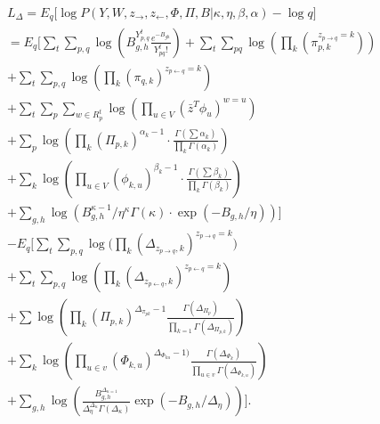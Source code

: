 \begin{align}
&L_{\Delta} = E_{q}\bigg[ \log \! P(Y, W, z_{\rightarrow}, z_{\leftarrow}, \Phi,
\Pi, B | \kappa, \eta, \beta, \alpha) - \log \! q \bigg]\nonumber\\
&= E_{q} \Bigg[ \sum_{t} \! \sum_{p,q} \! \log \left(
B_{g,h}^{Y_{p,q}^t} \frac{e^{-B_{gh}}}{Y_{pq}^{t}!} \right) +
\sum_{t} \! \sum_{pq} \! \log\left( \prod_{k} (\pi_{p,k}^{z_{p \rightarrow q} =
k}) \right) \nonumber\\
&+ \sum_{t} \! \sum_{p,q} \log \! \left(
\prod_{k}(\pi_{q,k})^{z_{p \leftarrow q} = k} \right)\nonumber\\ 
&+\sum_{t} \! \sum_{p} \! \sum_{w\in R_p^t}  \log \! \left(
\prod_{u\in V}(\bar{z}^T\phi_u)^{w = u} \right)
\nonumber\\ &+ 
\sum_{p} \! \log \left( \prod_{k}
(\Pi_{p,k})^{\alpha_{k} - 1} \cdot \frac{\Gamma(\sum \alpha_{k})}{\prod_{k}
\Gamma(\alpha_{k})} \right) \nonumber\\ & + 
\sum_{k} \! \log\left( \prod_{u\in V}
(\phi_{k,u})^{\beta_{k} - 1} \cdot \frac{\Gamma(\sum \beta_{k})}{\prod_{k}
\Gamma(\beta_{k})} \right) \nonumber\\ &+
 \sum_{g,h} \! \log \! \left( B_{g,h}^{\kappa - 1} /
\eta^{\kappa} \Gamma(\kappa) \cdot \exp(-B_{g,h}/\eta) \right) \Bigg]
\nonumber\\ 
& -E_{q} \Bigg[ \sum_{t} \! \sum_{p,q} \log \big( \prod_{k} (\Delta_{z_{p
\rightarrow q}, k})^{z_{p \rightarrow q}=k} \big) \nonumber \\&+ \sum_{t} \!
\sum_{p,q} \! \log \! \left(
\prod_{k} \! (\Delta_{z_{p \leftarrow q}, k})^{z_{p \leftarrow q} = k} \right)
  \nonumber \\
 &+\sum \! \log \left( \prod_{k} \! (\Pi_{p,k})^{\Delta_{\pi_{pk}}-1}
\frac{\Gamma(\Delta_{\Pi_{p}})}{\prod_{k=1} \! \Gamma(\Delta_{\Pi_{p,k}})}
\right) \nonumber \\ &+ 
\sum_{k} \log \! \left( \prod_{u \in v}
(\Phi_{k,u})^{\Delta_{\Phi_{ku}} - 1)} \frac{\Gamma(\Delta_{\Phi_{k}})}
{\prod_{u \in v} \! \Gamma(\Delta_{\Phi_{k,u}})} \right) \nonumber \\ 
&+ \sum_{g,h} \log \! \left(
\frac{B_{g,h}^{\Delta_{\kappa = 1}}}{\Delta_{\eta}^{\Delta_{\kappa}}
\Gamma(\Delta_{\kappa})} \exp(-B_{g,h}/\Delta_{\eta}) \right) \Bigg].
\label{eqn:VarLowerBound}
\end{align}

